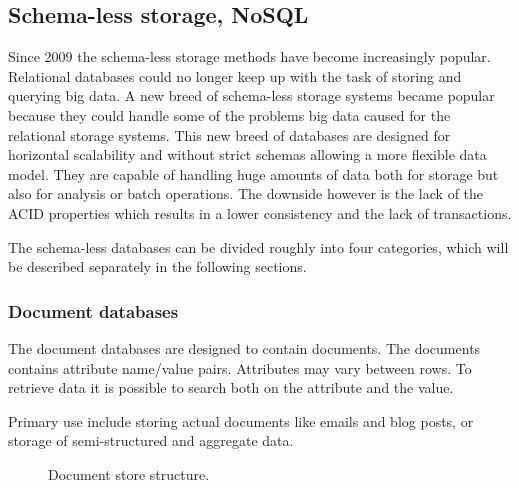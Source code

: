 \subsection{Schema-less storage, NoSQL}
\label{sec:nosql}
Since 2009 the schema-less storage methods have become increasingly popular.
Relational databases could no longer keep up with the task of storing and querying big data.
A new breed of schema-less storage systems became popular because they could handle some of the problems big data caused for the relational storage systems.
This new breed of databases are designed for horizontal scalability and without strict schemas allowing a more flexible data model. 
They are capable of handling huge amounts of data both for storage but also for analysis or batch operations.
The downside however is the lack of the ACID properties which results in a lower consistency and the lack of transactions. %

The schema-less databases can be divided roughly into four categories\cite{Fowler:IntroNoSQL, Moniruzzaman:NoSQLDatabaseNewEraOfDatabasesForBigDataAnalysis}, which will be described separately in the following sections.

\subsubsection{Document databases}
The document databases are designed to contain documents.
The documents contains attribute name/value pairs.
Attributes may vary between rows.
To retrieve data it is possible to search both on the attribute and the value.

Primary use include storing actual documents like emails and blog posts, or storage of semi-structured and aggregate data.

\begin{figure}
	\centering


		\caption[Document store]{
			\label{fig:DocumentStore}
			\footnotesize{%
				Document store structure.
			} 
	}
\end{figure}

